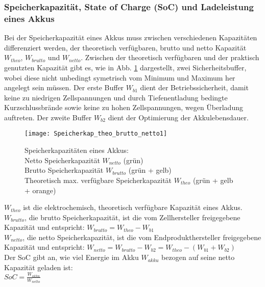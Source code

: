 	\subsubsection{Speicherkapazität, State of Charge (SoC) und Ladeleistung eines Akkus}
		Bei der Speicherkapazität eines Akkus muss zwischen verschiedenen Kapazitäten differenziert werden, der theoretisch verfügbaren, brutto und netto Kapazität $W_{theo}$, $W_{brutto}$ und $W_{netto}$. Zwischen der theoretisch verfügbaren und der praktisch genutzten Kapazität gibt es, wie in Abb. \ref{Abb:kap_theo_brutto_netto} dargestellt, zwei Sicherheitsbuffer, wobei diese nicht unbedingt symetrisch vom Minimum und Maximum her angelegt sein müssen. Der erste Buffer $W_{b1}$ dient der Betriebssicherheit, damit keine zu niedrigen Zellspannungen und durch Tiefenentladung bedingte Kurzschlussbrände sowie keine zu hohen Zellspannungen, wegen Überladung auftreten. Der zweite Buffer $W_{b2}$ dient der Optimierung der Akkulebensdauer.\\
		
					\begin{figure}[h]
						\centering
						\texttt{[image: Speicherkap\_theo\_brutto\_netto1]}
						\caption{Speicherkapazitäten eines Akkus: \\
								Netto Speicherkapazität $W_{netto}$ (grün)\\
								Brutto Speicherkapazität $W_{brutto}$ (grün + gelb) \\
								Theoretisch max. verfügbare Speicherkapazität  $W_{theo}$ (grün + gelb + orange)}
						\label{Abb:kap_theo_brutto_netto}
					\end{figure}
		
		$W_{theo}$ ist die elektrochemisch, theoretisch verfügbare Kapazität eines Akkus.\\
		
		$W_{brutto}$, die brutto Speicherkapazität, ist die vom Zellhersteller freigegebene Kapazität und entspricht: $W_{brutto} = W_{theo} - W_{b1} $ \\
		
		$W_{netto}$, die netto Speicherkapazität, ist die vom Endprodukthersteller freigegebene Kapazität und entspricht: $W_{netto} = W_{brutto} - W_{b2} = W_{theo} - (W_{b1}+W_{b2})$ \\
		
		Der \ac{SoC} gibt an, wie viel Energie im Akku $W_{akku}$ bezogen auf seine netto Kapazität geladen ist: \\ $ SoC = \frac{W_{akku}}{W_{netto}}$ \\
		
